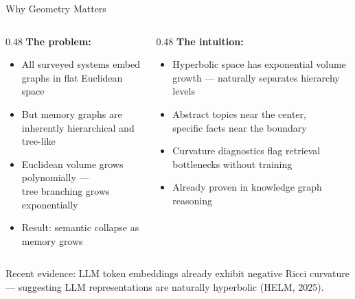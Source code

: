 \documentclass[aspectratio=169]{beamer}
\begin{document}
\begin{frame}{Why Geometry Matters}
  \begin{columns}[T]
    \begin{column}{0.48\textwidth}
      \textbf{The problem:}
      \begin{itemize}
        \item All surveyed systems embed graphs in \alert{flat Euclidean space}
        \item But memory graphs are inherently \alert{hierarchical} and tree-like
        \item Euclidean volume grows polynomially ---\\
          tree branching grows \alert{exponentially}
        \item Result: \alert{semantic collapse} as memory grows
      \end{itemize}
    \end{column}

    \begin{column}{0.48\textwidth}
      \textbf{The intuition:}
      \begin{itemize}
        \item \alert{Hyperbolic space} has exponential volume growth
          --- naturally separates hierarchy levels
        \item Abstract topics near the center,\\
          specific facts near the boundary
        \item \alert{Curvature diagnostics} flag retrieval bottlenecks
          without training
        \item Already proven in knowledge graph reasoning
      \end{itemize}
    \end{column}
  \end{columns}

  \vspace{0.3cm}

  {\small Recent evidence: LLM token embeddings already exhibit negative Ricci curvature ---
  suggesting LLM representations are naturally hyperbolic (HELM, 2025).}
\end{frame}
\end{document}
